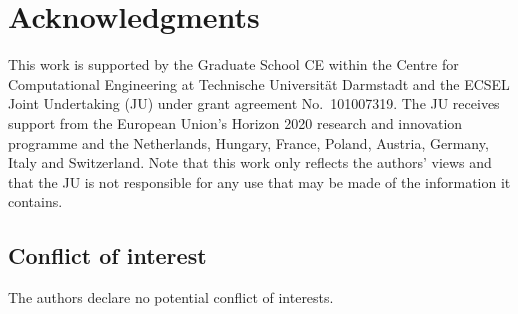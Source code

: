 \documentclass[AMA,STIX1COL]{WileyNJD-v2}
\begin{document}


\section*{Acknowledgments}
This work is supported by the Graduate School CE within the Centre for Computational Engineering at Technische Universit{\"a}t Darmstadt and the ECSEL Joint Undertaking (JU) under grant agreement No.~101007319. The JU receives support from the European Union's Horizon 2020 research and innovation programme and the Netherlands, Hungary, France, Poland, Austria, Germany, Italy and Switzerland. Note that this work only reflects the authors' views and that the JU is not responsible for any use that may be made of the information it contains.



\subsection*{Conflict of interest}
The authors declare no potential conflict of interests.
\end{document}
